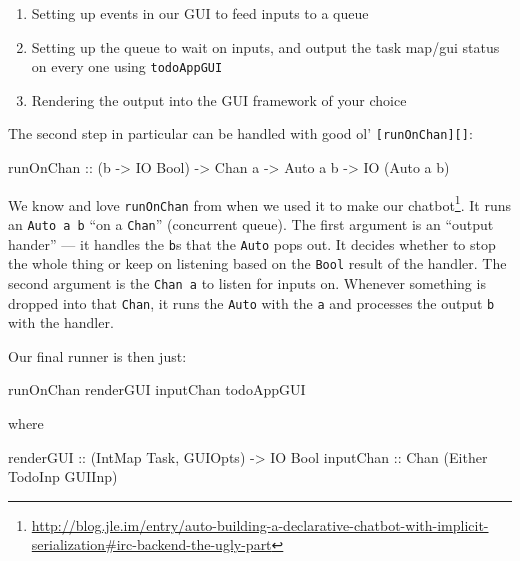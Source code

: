 \documentclass[]{article}
\newenvironment{Shaded}{}{}
\newcommand{\DataTypeTok}[1]{\textcolor[rgb]{0.56,0.13,0.00}{#1}}
\newcommand{\NormalTok}[1]{#1}
\newcommand{\OtherTok}[1]{\textcolor[rgb]{0.00,0.44,0.13}{#1}}
\renewcommand{\href}[2]{#2\footnote{\url{#1}}}
\begin{document}
\begin{enumerate}
\def\labelenumi{\arabic{enumi}.}
\tightlist
\item
  Setting up events in our GUI to feed inputs to a queue
\item
  Setting up the queue to wait on inputs, and output the task map/gui status on
  every one using \texttt{todoAppGUI}
\item
  Rendering the output into the GUI framework of your choice
\end{enumerate}

The second step in particular can be handled with good ol'
\texttt{{[}runOnChan{]}{[}{]}}:

\begin{Shaded}
\begin{Highlighting}[]
\OtherTok{runOnChan ::}\NormalTok{ (b }\OtherTok{{-}>} \DataTypeTok{IO} \DataTypeTok{Bool}\NormalTok{) }\OtherTok{{-}>} \DataTypeTok{Chan}\NormalTok{ a }\OtherTok{{-}>} \DataTypeTok{Auto\textquotesingle{}}\NormalTok{ a b }\OtherTok{{-}>} \DataTypeTok{IO}\NormalTok{ (}\DataTypeTok{Auto\textquotesingle{}}\NormalTok{ a b)}
\end{Highlighting}
\end{Shaded}

We know and love \texttt{runOnChan} from when we used it to make our
\href{http://blog.jle.im/entry/auto-building-a-declarative-chatbot-with-implicit-serialization\#irc-backend-the-ugly-part}{chatbot}.
It runs an \texttt{Auto\textquotesingle{}\ a\ b} ``on a \texttt{Chan}''
(concurrent queue). The first argument is an ``output hander'' --- it handles
the \texttt{b}s that the \texttt{Auto\textquotesingle{}} pops out. It decides
whether to stop the whole thing or keep on listening based on the \texttt{Bool}
result of the handler. The second argument is the \texttt{Chan\ a} to listen for
inputs on. Whenever something is dropped into that \texttt{Chan}, it runs the
\texttt{Auto\textquotesingle{}} with the \texttt{a} and processes the output
\texttt{b} with the handler.

Our final runner is then just:

\begin{Shaded}
\begin{Highlighting}[]
\NormalTok{runOnChan renderGUI inputChan todoAppGUI}
\end{Highlighting}
\end{Shaded}

where

\begin{Shaded}
\begin{Highlighting}[]
\OtherTok{renderGUI ::}\NormalTok{ (}\DataTypeTok{IntMap} \DataTypeTok{Task}\NormalTok{, }\DataTypeTok{GUIOpts}\NormalTok{) }\OtherTok{{-}>} \DataTypeTok{IO} \DataTypeTok{Bool}
\OtherTok{inputChan ::} \DataTypeTok{Chan}\NormalTok{ (}\DataTypeTok{Either} \DataTypeTok{TodoInp} \DataTypeTok{GUIInp}\NormalTok{)}
\end{Highlighting}
\end{Shaded}
\end{document}
